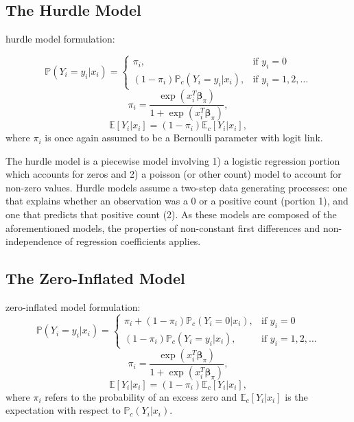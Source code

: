 \documentclass[jou, apacite]{apa6}
\begin{document}
\subsection{The Hurdle Model}

hurdle model formulation:

\begin{equation}
\mathbb{P}(Y_i = y_i|x_i) =
  \begin{cases}
    \pi_i, & \text{if } y_i = 0 \\
    (1 - \pi_i)\mathbb{P}_c(Y_i = y_i|x_i), & \text{if } y_i = 1, 2, \dots
  \end{cases}
\end{equation}
\begin{equation}
\pi_i = \dfrac{\exp (x_i^T \bm{\beta}_{\pi})}{1 + \exp (x_i^T \bm{\beta}_{\pi})},
\end{equation}
\begin{equation}
\mathbb{E}[Y_i|x_i] = (1 - \pi_i)\mathbb{E}_c[Y_i|x_i], %
\end{equation}
where $\pi_i$ is once again assumed to be a Bernoulli parameter with logit link.

The hurdle model is a piecewise model involving 1) a logistic regression portion which accounts for zeros and 2) a poisson (or other count) model to account for non-zero values. Hurdle models assume a two-step data generating processes: one that explains whether an observation was a 0 or a positive count (portion 1), and one that predicts that positive count (2). As these models are composed of the aforementioned models, the properties of non-constant first differences and non-independence of regression coefficients applies. 

\subsection{The Zero-Inflated Model}

zero-inflated model formulation:
\begin{equation}
\mathbb{P}(Y_i = y_i|x_i) =
  \begin{cases}
    \pi_i + (1 - \pi_i)\mathbb{P}_c(Y_i = 0|x_i), & \text{if } y_i = 0 \\
    (1 - \pi_i) \mathbb{P}_c(Y_i = y_i|x_i), & \text{if } y_i = 1, 2, \dots
  \end{cases}
\end{equation}
\begin{equation}
\pi_i = \dfrac{\exp (x_i^T \bm{\beta}_{\pi})}{1 + \exp (x_i^T \bm{\beta}_{\pi})},
\end{equation}
\begin{equation}
\mathbb{E}[Y_i|x_i] = (1 - \pi_i)\mathbb{E}_c[Y_i|x_i], %
\end{equation}
where $\pi_i$ refers to the probability of an excess zero and $\mathbb{E}_c[Y_i|x_i]$ is the expectation with respect to $\mathbb{P}_c(Y_i|x_i)$.
\end{document}
